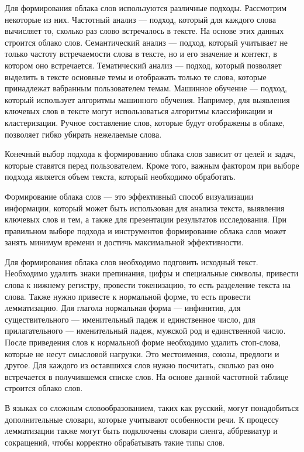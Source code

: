 \documentclass[bachelor, och, coursework ]{SCWorks}
\begin{document}
Для формирования облака слов используются различные подходы. Рассмотрим некоторые из них.
Частотный анализ --- подход, который для каждого слова вычисляет то, сколько раз слово встречалось в тексте. На основе этих данных строится облако слов.
Семантический анализ --- подход, который учитывает не только частоту встречаемости слова в тексте, но и его значение и контект, в котором оно встречается.
Тематический анализ --- подход, который позволяет выделить в тексте основные темы и отображать только те слова, которые принадлежат вабранным пользователем темам.
Машинное обучение --- подход, который использует алгоритмы машинного обучения. Например, для выявления ключевых слов в тексте могут использоваться алгоритмы классификации и кластеризации.
Ручное составление слов, которые будут отображены в облаке, позволяет гибко убирать нежелаемые слова.

Конечный выбор подхода к формированию облака слов зависит от целей и задач, которые ставятся перед пользователем. Кроме того, важным фактором при выборе подхода является объем текста, который необходимо обработать. 

Формирование облака слов --- это эффективный способ визуализации информации, который может быть использован для анализа текста, выявления ключевых слов и тем, а также для презентации результатов исследования. При правильном выборе подхода и инструментов формирование облака слов может занять минимум времени и достичь максимальной эффективности.

Для формирования облака слов необходимо подговить исходный текст. Необходимо удалить знаки препинания, цифры и специальные символы, привести слова к нижнему регистру, провести токенизацию, то есть разделение текста на слова. Также нужно привесте к нормальной форме, то есть провести лемматизацию.
Для глагола нормальная форма --- инфинитив, для существительного --- именительный падеж и единственное число, для прилагательного --- именительный падеж, мужской род и единственной число. 
После приведения слов к нормальной форме необходимо удалить стоп-слова, которые не несут смысловой нагрузки. Это местоимения, союзы, предлоги и другое. Для каждого из оставшихся слов нужно посчитать, сколько раз оно встречается в получившемся списке слов. На основе данной частотной таблице строится облако слов.

В языках со сложным словообразованием, таких как русский, могут понадобиться дополнительные словари, которые учитывают особенности речи. К процессу лемматизации также могут быть подключены словари сленга, аббревиатур и сокращений, чтобы корректно обрабатывать такие типы слов.
\end{document}
